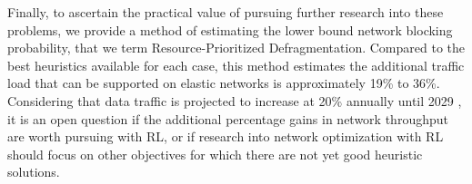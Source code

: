 Finally, to ascertain the practical value of pursuing further research into these problems, we provide a method of estimating the lower bound network blocking probability, that we term Resource-Prioritized Defragmentation. Compared to the best heuristics available for each case, this method estimates the additional traffic load that can be supported on elastic networks is approximately 19\% to 36\%. Considering that data traffic is projected to increase at 20\% annually until 2029 \cite{ericsson_ab_ericsson_2024}, it is an open question if the additional percentage gains in network throughput are worth pursuing with RL, or if research into network optimization with RL should focus on other objectives for which there are not yet good heuristic solutions.



